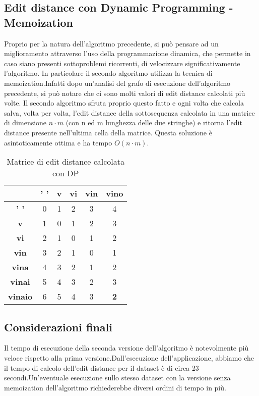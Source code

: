 \subsection{Edit distance con Dynamic Programming - Memoization}
Proprio per la natura dell'algoritmo precedente, si può pensare ad un miglioramento attraverso l'uso della programmazione dinamica, che permette in caso siano presenti sottoproblemi ricorrenti, di velocizzare significativamente l'algoritmo.
In particolare il secondo algoritmo utilizza la tecnica di memoization.\newline Infatti dopo un'analisi del grafo di esecuzione dell'algoritmo precedente, si può notare che ci sono molti valori di edit distance calcolati più volte. \newline Il secondo algoritmo sfruta proprio questo fatto e ogni volta che calcola salva, volta per volta, l'edit distance della sottosequenza calcolata in una matrice di dimensione $n \cdot m$ (con n ed m lunghezza delle due stringhe) e ritorna l'edit distance presente nell'ultima cella della matrice. Questa soluzione è asintoticamente ottima e ha tempo $O(n \cdot m)$.


\begin{table}[h]
\centering
\begin{tabular}{|c|c|c|c|c|c|}
\hline
\textbf{}       & \textbf{' '} & \textbf{v} & \textbf{vi} & \textbf{vin} & \textbf{vino} \\ \hline
\textbf{' '}    & 0            & 1          & 2           & 3            & 4             \\ \hline
\textbf{v}      & 1            & 0          & 1           & 2            & 3             \\ \hline
\textbf{vi}     & 2            & 1          & 0           & 1            & 2             \\ \hline
\textbf{vin}    & 3            & 2          & 1           & 0            & 1             \\ \hline
\textbf{vina}   & 4            & 3          & 2           & 1            & 2             \\ \hline
\textbf{vinai}  & 5            & 4          & 3           & 2            & 3             \\ \hline
\textbf{vinaio} & 6            & 5          & 4           & 3            & \textbf{2}    \\ \hline
\end{tabular}
\caption*{Matrice di edit distance calcolata con DP}

\end{table}


\subsection{Considerazioni finali}
Il tempo di esecuzione della seconda versione dell'algoritmo è notevolmente più veloce rispetto alla prima versione.\newline Dall'esecuzione dell'applicazione, abbiamo che il tempo di calcolo dell'edit distance per il dataset è di circa 23 secondi.\newline Un'eventuale esecuzione sullo stesso dataset con la versione senza memoization dell'algoritmo richiederebbe diversi ordini di tempo in più.